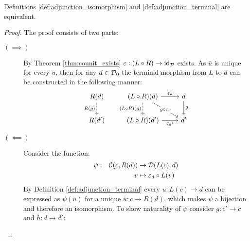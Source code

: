 \begin{theorem}
  Definitions \ref{def:adjunction_isomorphism} and \ref{def:adjunction_terminal}
  are equivalent.

  \begin{proof}
    The proof consists of two parts:
    \begin{description}
      \item[$(\implies)$] By Theorem \ref{thm:counit_exists} $\varepsilon:(L\circ
        R) \to \mathrm{id}_{\mathcal{D}}$ exists. As $\bar{u}$ is unique for every $u$, then for
        any $d\in\mathcal{D}_0$ the terminal morphism from $L$ to $d$ can be constructed
        in the following manner:
        \[\begin{tikzcd}[ampersand replacement=\&] {R(d)} \& {(L\circ R)(d)} \&
          d \\
          {R(d')} \& {(L\circ R)(d')} \& {d'}
          \arrow["{\epsilon_d}", from=1-2, to=1-3]
          \arrow["{\epsilon_{d'}}"', from=2-2, to=2-3]
          \arrow["g", from=1-3, to=2-3]
          \arrow["{R(g)}"', dashed, from=1-1, to=2-1]
          \arrow["{g\circ \epsilon_d}"{description}, from=1-2, to=2-3]
          \arrow["{(L\circ R)(g)}"', dashed, from=1-2, to=2-2]
        \end{tikzcd}\]
      \item[$(\impliedby)$] Consider the function:
        \[
          \begin{aligned}
            \psi:&&\mathcal{C}(c, R(d)) &\to \mathcal{D}(L(c), d)\\
            &&v&\mapsto \varepsilon_d\circ L(v)
          \end{aligned}
        \]
        By Definition \ref{def:adjunction_terminal} every $u:L(c)\to d$ can be
        expressed as $\psi(\bar{u})$ for a unique $\bar{u}:c\to R(d)$, which
        makes $\psi$ a bijection and therefore an isomorphism. To show
        naturality of $\psi$ consider $g:c'\to c$ and $h:d\to d'$:

\end{description}
\end{proof}
\end{theorem}
